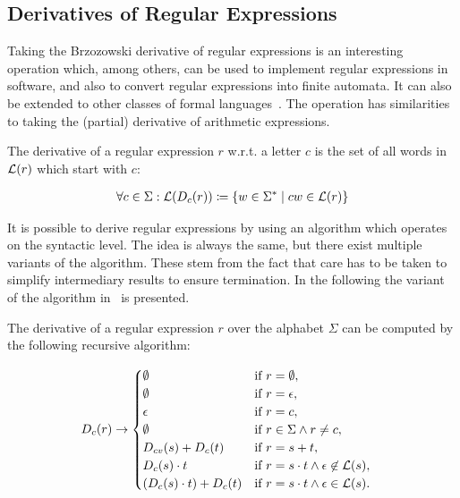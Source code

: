 \subsection{Derivatives of Regular Expressions}

Taking the Brzozowski derivative of regular expressions is an interesting operation which, among others, can be used
to implement regular expressions in software, and also to convert regular expressions into finite automata.
It can also be extended to other classes of formal languages~\cite{parsing-with-derivatives}.
The operation has similarities to taking the (partial) derivative of arithmetic expressions.

\begin{definition}
    The derivative of a regular expression $r$ w.r.t. a letter $c$ is
    the set of all words in $\mathcal{L}(r)$ which start with $c$:

    \begin{align}
        \forall c \in \Sigma: \mathcal{L}(D_c(r)) \coloneqq \{ w \in \Sigma^\ast \mid c w \in \mathcal{L}(r) \}
    \end{align}
\end{definition}

It is possible to derive regular expressions by using an algorithm which operates on the syntactic level.
The idea is always the same, but there exist multiple variants of the algorithm.
These stem from the fact that care has to be taken to simplify intermediary results to ensure termination.
In the following the variant of the algorithm in~\cite{proof-pearl-regular-expression-equivalence} is presented.

\begin{definition}
    The derivative of a regular expression $r$ over the alphabet $\Sigma$
    can be computed by the following recursive algorithm:

    \begin{align}
        D_{c}(r) &\rightarrow
        \begin{cases}
            \emptyset                       & \text{if } r = \emptyset,\\
            \emptyset                       & \text{if } r = \epsilon,\\
            \epsilon                        & \text{if } r = c,\\
            \emptyset                       & \text{if } r \in \Sigma \land r \neq c,\\
            D_{c v}(s) + D_c(t)                 & \text{if } r = s + t,\\
            D_c(s) \cdot t                  & \text{if } r = s \cdot t \land \epsilon \not\in \mathcal{L}(s),\\
            (D_c(s) \cdot t) + D_c(t)       & \text{if } r = s \cdot t \land \epsilon \in \mathcal{L}(s).
        \end{cases}
    \end{align}
\end{definition}

